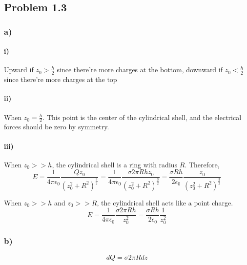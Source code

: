 \documentclass[../homework.tex]{subfiles}
\begin{document}
\subsection{Problem 1.3}
\subsubsection*{a)}

\paragraph{i)}
\begin{subp}

    Upward if $z_0 > \frac{h}{2}$ since there're more charges at the bottom, downward if $z_0 < \frac{h}{2}$ since there're more charges at the top
\end{subp}

\paragraph{ii)}
\begin{subp}

    When $z_0 = \frac{h}{2}$. This point is the center of the cylindrical shell, and the electrical forces should be zero by symmetry.
\end{subp}

\paragraph{iii)}
\begin{subp}

    When $z_0 >>h$, the cylindrical shell is a ring with radius $R$. Therefore,
    \begin{equation*}
        E = \frac{1}{4\pi \epsilon_0} \frac{Qz_0}{(z_0^2 + R^2)^\frac{3}{2}} = \frac{1}{4\pi \epsilon_0} \frac{\sigma 2 \pi R h z_0}{(z_0^2 + R^2)^\frac{3}{2}} = \frac{\sigma R h}{2 \epsilon_0} \frac{z_0}{(z_0^2 + R^2)^\frac{3}{2}}
    \end{equation*}

    When $z_0 >> h$ and $z_0 >> R$, the cylindrical shell acts like a point charge.
    \begin{equation*}
        E = \frac{1}{4\pi \epsilon_0} \frac{\sigma 2\pi R h}{z_0^2} = \frac{\sigma R h}{2 \epsilon_0} \frac{1}{z_0^2}
    \end{equation*}
\end{subp}

\subsubsection*{b)}
\begin{equation*}
    dQ = \sigma 2\pi R dz
\end{equation*}
\end{document}
